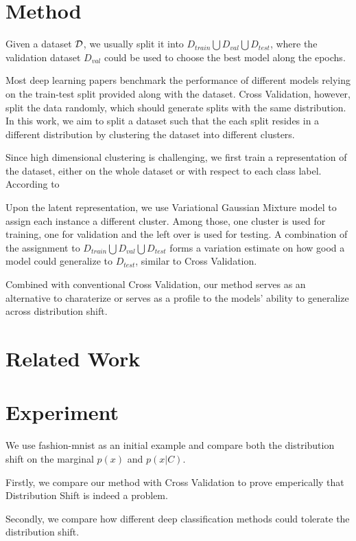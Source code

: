 \documentclass{article}
\begin{document}
\section{Method}
Given a dataset $\mathcal{D}$, we usually split it into $D_{train} \bigcup D_{val} \bigcup D_{test}$, where the validation dataset $D_{val}$ could be used to choose the best model along the epochs.

Most deep learning papers benchmark the performance of different models relying on the train-test split provided along with the dataset. Cross Validation, however, 
split the data randomly, which should generate splits with the same distribution. In this work, we aim to split a dataset such that the each split resides in a different distribution by clustering the  dataset into different clusters.

Since high dimensional clustering is challenging, we first train a representation of the dataset, either on the whole dataset or with respect to each class label. According to \cite{zhang2013domain}

Upon the latent representation, we use Variational Gaussian Mixture model to assign each instance a different cluster. Among those, one cluster is used for training, one for validation and the left over is used for testing. A combination of the assignment to $D_{train} \bigcup D_{val} \bigcup D_{test}$ forms a variation estimate on how good a model could generalize to $D_{test}$, similar to Cross Validation.

Combined with conventional Cross Validation, our method serves as an alternative to charaterize or serves as a profile to the models' ability to generalize across distribution shift.
 
\section{Related Work}
\section{Experiment}
We use fashion-mnist \cite{FIXME} as an initial example and compare both the distribution shift on the marginal $p(x)$ and $p(x|C)$. 

Firstly, we compare our method with Cross Validation to prove emperically that Distribution Shift is indeed  a problem.

Secondly, we compare how different deep classification methods could tolerate the distribution shift.
\end{document}
